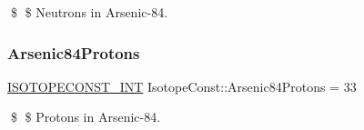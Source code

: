 \$ \$ Neutrons in Arsenic-\/84. \mbox{\label{group___isotope_const-_arsenic-_as84_ga4734d64701c8feea43ea3da60c64ca5d}} 
\subsubsection{\texorpdfstring{Arsenic84\+Protons}{Arsenic84Protons}}
{\footnotesize\ttfamily \mbox{\hyperlink{group___isotope_const-_macros_ga5f18360b3e99483a35c32d789e62621c}{I\+S\+O\+T\+O\+P\+E\+C\+O\+N\+S\+T\+\_\+\+I\+NT}} Isotope\+Const\+::\+Arsenic84\+Protons = 33}

\$ \$ Protons in Arsenic-\/84. 
